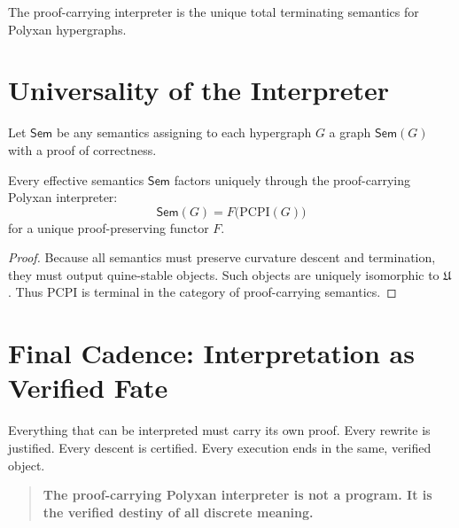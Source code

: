 \begin{corollary}[Finality]
The proof-carrying interpreter is the unique total terminating semantics
for Polyxan hypergraphs.
\end{corollary}


\section{Universality of the Interpreter}
\label{sec:universality}

Let $\mathsf{Sem}$ be any semantics assigning to each hypergraph $G$ a
graph $\mathsf{Sem}(G)$ with a proof of correctness.

\begin{theorem}[Universality]
Every effective semantics $\mathsf{Sem}$ factors uniquely through the
proof-carrying Polyxan interpreter:
\[
\mathsf{Sem}(G)
=
F\big(\mathrm{PCPI}(G)\big)
\]
for a unique proof-preserving functor $F$.
\end{theorem}

\begin{proof}
Because all semantics must preserve curvature descent and termination,
they must output quine-stable objects.  
Such objects are uniquely isomorphic to $\mathfrak{U}$.
Thus $\mathrm{PCPI}$ is terminal in the category of proof-carrying
semantics.
\end{proof}


\section{Final Cadence: Interpretation as Verified Fate}

Everything that can be interpreted must carry its own proof.  
Every rewrite is justified.  
Every descent is certified.  
Every execution ends in the same, verified object.

\begin{quote}
\textbf{The proof-carrying Polyxan interpreter is not a program.  
It is the verified destiny of all discrete meaning.}
\end{quote}

